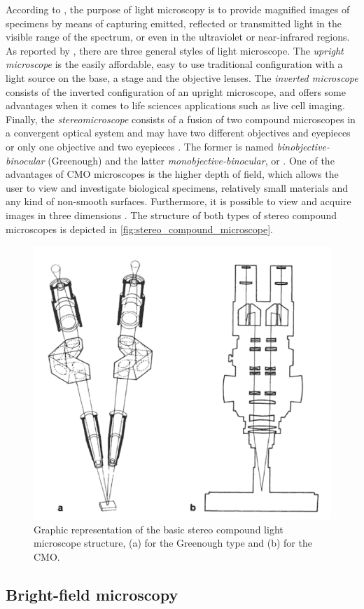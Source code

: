 According to , the purpose of light microscopy is to provide magnified images of specimens by means of capturing emitted, reflected or transmitted light in the visible range of the spectrum, or even in the ultraviolet or near-infrared regions. As reported by , there are three general styles of light microscope. The \emph{upright microscope} is the easily affordable, easy to use traditional configuration with a light source on the base, a stage and the objective lenses. The \emph{inverted microscope} consists of the inverted configuration of an upright microscope, and offers some advantages when it comes to life sciences applications such as live cell imaging. Finally, the \emph{stereomicroscope} consists of a fusion of two compound microscopes in a convergent optical system and may have two different objectives and eyepieces or only one objective and two eyepieces \cite{schreier2004advances}. The former is named \emph{binobjective-binocular} (Greenough) and the latter \emph{monobjective-binocular}, or . One of the advantages of CMO microscopes is the higher depth of field, which allows the user to view and investigate biological specimens, relatively small materials and any kind of non-smooth surfaces. Furthermore, it is possible to view and acquire images in three dimensions \cite{rochow1994introduction}. The structure of both types of stereo compound microscopes is depicted in \autoref{fig:stereo_compound_microscope}.

\begin{figure}[htb]
	\centering
	\caption{\label{fig:stereo_compound_microscope} Graphic representation of the basic stereo compound light microscope structure, (a) for the Greenough type and (b) for the CMO.}
	\begin{center}
	    \includegraphics[scale=0.4]{images/stereomicroscope.png}
	\end{center}
	\centering
\end{figure}

\subsection{Bright-field microscopy}
